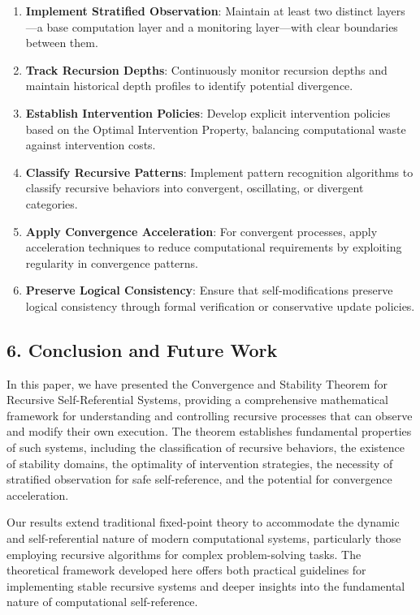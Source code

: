 \documentclass[
]{article}
\begin{document}
\begin{enumerate}
\def\labelenumi{\arabic{enumi}.}
\item
  \textbf{Implement Stratified Observation}: Maintain at least two
  distinct layers---a base computation layer and a monitoring
  layer---with clear boundaries between them.
\item
  \textbf{Track Recursion Depths}: Continuously monitor recursion depths
  and maintain historical depth profiles to identify potential
  divergence.
\item
  \textbf{Establish Intervention Policies}: Develop explicit
  intervention policies based on the Optimal Intervention Property,
  balancing computational waste against intervention costs.
\item
  \textbf{Classify Recursive Patterns}: Implement pattern recognition
  algorithms to classify recursive behaviors into convergent,
  oscillating, or divergent categories.
\item
  \textbf{Apply Convergence Acceleration}: For convergent processes,
  apply acceleration techniques to reduce computational requirements by
  exploiting regularity in convergence patterns.
\item
  \textbf{Preserve Logical Consistency}: Ensure that self-modifications
  preserve logical consistency through formal verification or
  conservative update policies.
\end{enumerate}

\subsection{6. Conclusion and Future
Work}\label{conclusion-and-future-work}

In this paper, we have presented the Convergence and Stability Theorem
for Recursive Self-Referential Systems, providing a comprehensive
mathematical framework for understanding and controlling recursive
processes that can observe and modify their own execution. The theorem
establishes fundamental properties of such systems, including the
classification of recursive behaviors, the existence of stability
domains, the optimality of intervention strategies, the necessity of
stratified observation for safe self-reference, and the potential for
convergence acceleration.

Our results extend traditional fixed-point theory to accommodate the
dynamic and self-referential nature of modern computational systems,
particularly those employing recursive algorithms for complex
problem-solving tasks. The theoretical framework developed here offers
both practical guidelines for implementing stable recursive systems and
deeper insights into the fundamental nature of computational
self-reference.
\end{document}
